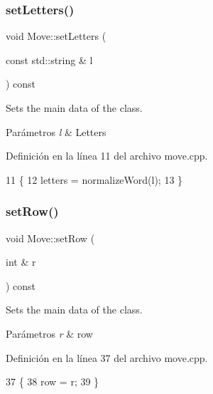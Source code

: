\subsubsection{\texorpdfstring{set\+Letters()}{setLetters()}}
{\footnotesize\ttfamily void Move\+::set\+Letters (\begin{DoxyParamCaption}\item[{const std\+::string \&}]{l }\end{DoxyParamCaption}) const}



Sets the main data of the class. 


\begin{DoxyParams}{Parámetros}
{\em l} & Letters \\
\hline
\end{DoxyParams}


Definición en la línea 11 del archivo move.\+cpp.


\begin{DoxyCode}
11                                     \{
12     letters = normalizeWord(l);
13 \}
\end{DoxyCode}
\mbox{\label{classMove_a7389abf2c4bca5ac05b374c91aba67ac}} 
\subsubsection{\texorpdfstring{set\+Row()}{setRow()}}
{\footnotesize\ttfamily void Move\+::set\+Row (\begin{DoxyParamCaption}\item[{int \&}]{r }\end{DoxyParamCaption}) const}



Sets the main data of the class. 


\begin{DoxyParams}{Parámetros}
{\em r} & row \\
\hline
\end{DoxyParams}


Definición en la línea 37 del archivo move.\+cpp.


\begin{DoxyCode}
37                              \{
38     row = r;
39 \}
\end{DoxyCode}
\mbox{\label{classMove_a21b314522e08b27c13c394ae5b14da48}} 
